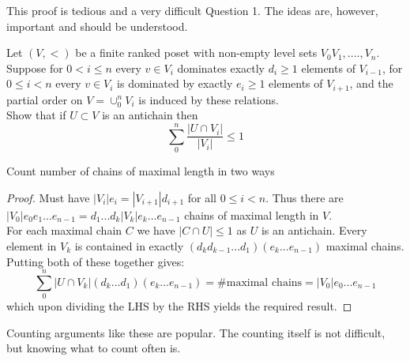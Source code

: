 \documentclass[a4paper]{article}
\begin{document}
	\begin{remark}
	This proof is tedious and a very difficult Question 1. The ideas are, however, important and should be understood.
	\end{remark}

	\begin{question}[Question 2]
	Let $(V, <)$ be a finite ranked poset with non-empty level sets $V_0 V_1,....,V_n$. Suppose for $0 < i \leq n$ every $v \in V_i$ dominates exactly $d_i \geq 1$ elements of $V_{i-1}$, for $0 \leq i < n$ every $v \in V_i$ is dominated by exactly $e_i \geq 1$ elements of $V_{i+1}$, and the partial order on $V = \cup_0^n V_i$ is induced by these relations.\\
	Show that if $U \subset V$ is an antichain then
	\[\sum_0^n{\frac{|U \cap V_i|}{|V_i|}} \leq 1\]
	\end{question}
	\begin{idea}
	Count number of chains of maximal length in two ways
	\end{idea}
	\begin{proof}
	Must have $|V_i|e_i = |V_{i+1}|d_{i+1}$ for all $0 \leq i < n$. Thus there are $|V_0| e_0 e_1 ... e_{n-1} = d_1 ... d_k |V_k|e_k ... e_{n-1}$ chains of maximal length in $V$.\\
	For each maximal chain $C$ we have $|C \cap U| \leq 1$ as $U$ is an antichain. Every element in $V_k$ is contained in exactly $(d_k d_{k-1} ... d_1)(e_k ... e_{n-1})$ maximal chains.\\
	Putting both of these together gives:
	\[\sum_0^n | U \cap V_k | (d_k ... d_ 1)(e_k ... e_{n-1}) = \# \text{maximal chains} = |V_0|e_0 ... e_{n-1}\]
	which upon dividing the LHS by the RHS yields the required result.

	\end{proof}
	\begin{remark}
	Counting arguments like these are popular. The counting itself is not difficult, but knowing what to count often is.
	\end{remark}
\end{document}
